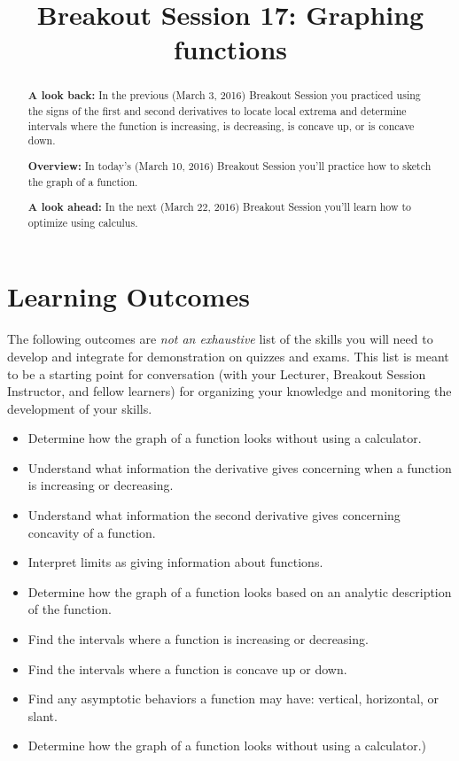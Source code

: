 \documentclass[handout,nooutcomes]{ximera}
\title{Breakout Session 17: Graphing functions}
\begin{document}
\begin{abstract}
  \textbf{A look back:} In the previous (March 3, 2016) Breakout Session you practiced using the signs of the first and second derivatives to locate local extrema and determine intervals where the function is increasing, is decreasing, is concave up, or is concave down.

  \textbf{Overview:} In today's (March 10, 2016) Breakout Session you'll practice how to sketch the graph  of a function.
  
  \textbf{A look ahead:} In the next (March 22, 2016) Breakout Session you'll learn how to optimize using calculus.
\end{abstract}
\maketitle

\section{Learning Outcomes}
\label{section:learning-outcomes}
The following outcomes are \emph{not an exhaustive} list of the skills you will need to develop and integrate for demonstration on quizzes and exams.
This list is meant to be a starting point for conversation (with your Lecturer, Breakout Session Instructor, and fellow learners) for organizing your knowledge and monitoring the development of your skills.

\begin{itemize}
  \item
    Determine how the graph of a function looks without using a calculator.
  \item
    Understand what information the derivative gives concerning when a function is increasing or decreasing.
  \item
    Understand what information the second derivative gives concerning concavity of a function.
  \item
    Interpret limits as giving information about functions.
  \item
    Determine how the graph of a function looks based on an analytic description of the function.
  \item
    Find the intervals where a function is increasing or decreasing.
  \item
    Find the intervals where a function is concave up or down.
  \item
    Find any asymptotic behaviors a function may have: vertical, horizontal, or slant.
  \item
    Determine how the graph of a function looks without using a calculator.)
\end{itemize}
\newpage
\end{document}
